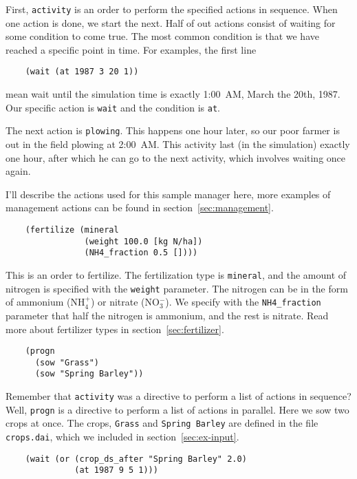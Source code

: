\documentclass[a4paper]{article}
\begin{document}
First, \texttt{activity} is an order to perform the specified actions
in sequence.  When one action is done, we start the next.  Half of out
actions consist of waiting for some condition to come true.  The most
common condition is that we have reached a specific point in time.
For examples, the first line

\begin{verbatim}
    (wait (at 1987 3 20 1))
\end{verbatim}

mean wait until the simulation time is exactly 1:00~AM, March the
20th, 1987.  Our specific action is \texttt{wait} and the condition is
\texttt{at}.

The next action is \texttt{plowing}.  This happens one hour later, so
our poor farmer is out in the field plowing at 2:00~AM\@.  This activity
last (in the simulation) exactly one hour, after which he can go to
the next activity, which involves waiting once again.

I'll describe the actions used for this sample manager here, more
examples of management actions can be found in
section~\ref{sec:management}.

\begin{verbatim}
    (fertilize (mineral
                (weight 100.0 [kg N/ha])
                (NH4_fraction 0.5 [])))
\end{verbatim}

This is an order to fertilize.  The fertilization type is
\texttt{mineral}, and the amount of nitrogen is specified with the
\texttt{weight} parameter.  The nitrogen can be in the form of
ammonium (NH$_4^+$) or nitrate (NO$_3^-$).  We specify with the
\texttt{NH4\_fraction } parameter that half the nitrogen is ammonium,
and the rest is nitrate.  Read more about fertilizer types in
section~\ref{sec:fertilizer}.

\begin{verbatim}
    (progn
      (sow "Grass")
      (sow "Spring Barley"))
\end{verbatim}

Remember that \texttt{activity} was a directive to perform a list of
actions in sequence?  Well, \texttt{progn} is a directive to perform a
list of actions in parallel.  Here we sow two crops at once.  The
crops, \texttt{Grass} and \texttt{Spring Barley} are defined in the
file \texttt{crops.dai}, which we included in
section~\ref{sec:ex-input}.

\begin{verbatim}
    (wait (or (crop_ds_after "Spring Barley" 2.0)
              (at 1987 9 5 1)))
\end{verbatim}
\end{document}

